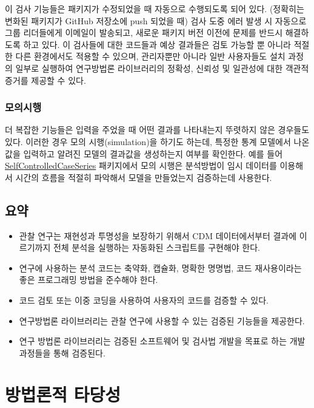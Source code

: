 \documentclass[11pt]{book}
\theoremstyle{definition}
\theoremstyle{definition}
\theoremstyle{definition}
\theoremstyle{remark}
\let\BeginKnitrBlock\begin \let\EndKnitrBlock\end
\begin{document}
이 검사 기능들은 패키지가 수정되었을 때 자동으로 수행되도록 되어 있다.
(정확히는 변화된 패키지가 GitHub 저장소에 push 되었을 때) 검사 도중 에러
발생 시 자동으로 그룹 리더들에게 이메일이 발송되고, 새로운 패키지 버전
이전에 문제를 반드시 해결하도록 하고 있다. 이 검사들에 대한 코드들과
예상 결과들은 검토 가능할 뿐 아니라 적절한 다른 환경에서도 적용할 수
있으며, 관리자뿐만 아니라 일반 사용자들도 설치 과정의 일부로 실행하여
연구방법론 라이브러리의 정확성, 신뢰성 및 일관성에 대한 객관적 증거를
제공할 수 있다.

\subsection{모의시행}

더 복잡한 기능들은 입력을 주었을 때 어떤 결과를 나타내는지 뚜렷하지 않은
경우들도 있다. 이러한 경우 모의 시행(simulation)을 하기도 하는데, 특정한
통계 모델에서 나온 값을 입력하고 알려진 모델의 결과값을 생성하는지
여부를 확인한다. 예를 들어
\href{https://ohdsi.github.io/SelfControlledCaseSeries/}{SelfControlledCaseSeries}
패키지에서 모의 시행은 분석방법이 임시 데이터를 이용해서 시간의 흐름을
적절히 파악해서 모델을 만들었는지 검증하는데 사용한다.

\section{요약}\label{-15}

\BeginKnitrBlock{rmdsummary}
\begin{itemize}
\item
  관찰 연구는 재현성과 투명성을 보장하기 위해서 CDM 데이터에서부터
  결과에 이르기까지 전체 분석을 실행하는 자동화된 스크립트를 구현해야
  한다.
\item
  연구에 사용하는 분석 코드는 축약화, 캡슐화, 명확한 명명법, 코드
  재사용이라는 좋은 프로그래밍 방법을 준수해야 한다.
\item
  코드 검토 또는 이중 코딩을 사용하여 사용자의 코드를 검증할 수 있다.
\item
  연구방법론 라이브러리는 관찰 연구에 사용할 수 있는 검증된 기능들을
  제공한다.
\item
  연구 방법론 라이브러리는 검증된 소프트웨어 및 검사법 개발을 목표로
  하는 개발 과정들을 통해 검증된다.
\end{itemize}
\EndKnitrBlock{rmdsummary}

\chapter{방법론적 타당성}\label{MethodValidity}
\end{document}
